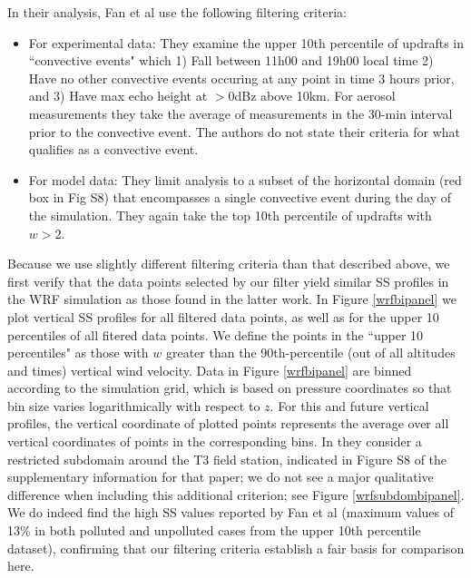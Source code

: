 \documentclass{article}
\begin{document}
In their analysis, Fan et al use the following filtering criteria:
\begin{itemize}
	\item For experimental data: They examine the upper 10th percentile of updrafts in ``convective events" which 1) Fall between 11h00 and 19h00 local time 2) Have no other convective events occuring at any point in time 3 hours prior, and 3) Have max echo height at $>$0dBz above 10km. For aerosol measurements they take the average of measurements in the 30-min interval prior to the convective event. The authors do not state their criteria for what qualifies as a convective event.
	\item For model data: They limit analysis to a subset of the horizontal domain (red box in Fig S8) that encompasses a single convective event during the day of the simulation. They again take the top 10th percentile of updrafts with $w>2$. 
\end{itemize}

Because we use slightly different filtering criteria than that described above, we first verify that the data points selected by our filter yield similar SS profiles in the WRF simulation as those found in the latter work. In Figure \ref{wrfbipanel} we plot vertical SS profiles for all filtered data points, as well as for the upper 10 percentiles of all fitered data points. We define the points in the ``upper 10 percentiles" as those with $w$ greater than the 90th-percentile (out of all altitudes and times) vertical wind velocity. Data in Figure \ref{wrfbipanel} are binned according to the simulation grid, which is based on pressure coordinates so that bin size varies logarithmically with respect to $z$. For this and future vertical profiles, the vertical coordinate of plotted points represents the average over all vertical coordinates of points in the corresponding bins. In \cite{Fan2018} they consider a restricted subdomain around the T3 field station, indicated in Figure S8 of the supplementary information for that paper; we do not see a major qualitative difference when including this additional criterion; see Figure \ref{wrfsubdombipanel}. We do indeed find the high SS values reported by Fan et al (maximum values of 13\% in both polluted and unpolluted cases from the upper 10th percentile dataset), confirming that our filtering criteria establish a fair basis for comparison here.
\end{document}
